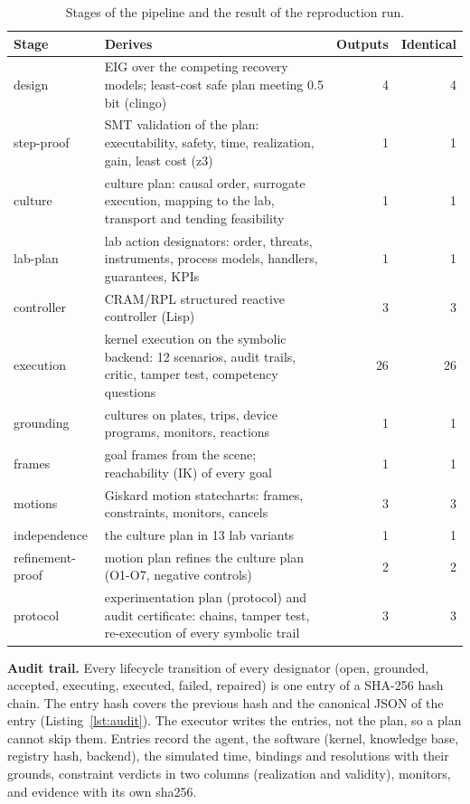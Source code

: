 \documentclass[10pt,a4paper]{article}
\begin{document}
\begin{table}[tbp]\centering\small
\caption{Stages of the pipeline and the result of the reproduction run.}\label{tab:repro}
\begin{tabularx}{\linewidth}{lXrr}\toprule
\textbf{Stage} & \textbf{Derives} & \textbf{Outputs} & \textbf{Identical} \\\midrule
design & EIG over the competing recovery models; least-cost safe plan meeting 0.5 bit (clingo) & 4 & 4 \\
step-proof & SMT validation of the plan: executability, safety, time, realization, gain, least cost (z3) & 1 & 1 \\
culture & culture plan: causal order, surrogate execution, mapping to the lab, transport and tending feasibility & 1 & 1 \\
lab-plan & lab action designators: order, threats, instruments, process models, handlers, guarantees, KPIs & 1 & 1 \\
controller & CRAM/RPL structured reactive controller (Lisp) & 3 & 3 \\
execution & kernel execution on the symbolic backend: 12 scenarios, audit trails, critic, tamper test, competency questions & 26 & 26 \\
grounding & cultures on plates, trips, device programs, monitors, reactions & 1 & 1 \\
frames & goal frames from the scene; reachability (IK) of every goal & 1 & 1 \\
motions & Giskard motion statecharts: frames, constraints, monitors, cancels & 3 & 3 \\
independence & the culture plan in 13 lab variants & 1 & 1 \\
refinement-proof & motion plan refines the culture plan (O1-O7, negative controls) & 2 & 2 \\
protocol & experimentation plan (protocol) and audit certificate: chains, tamper test, re-execution of every symbolic trail & 3 & 3 \\\bottomrule
\end{tabularx}
\end{table}

\textbf{Audit trail.} Every lifecycle transition of every designator (open, grounded, accepted, executing, executed, failed, repaired) is one entry of a SHA-256 hash chain. The entry hash covers the previous hash and the canonical JSON of the entry (Listing~\ref{lst:audit}). The executor writes the entries, not the plan, so a plan cannot skip them. Entries record the agent, the software (kernel, knowledge base, registry hash, backend), the simulated time, bindings and resolutions with their grounds, constraint verdicts in two columns (realization and validity), monitors, and evidence with its own sha256.
\end{document}
